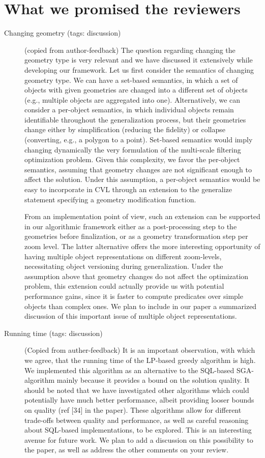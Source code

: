 \documentclass[11pt, oneside]{article}   	%
\begin{document}
\section{What we promised the reviewers}

\begin{description}
\item[Changing geometry (tags: discussion)] (copied from author-feedback) The question regarding changing the geometry type is very relevant and we have discussed it extensively while developing our framework. Let us first consider the semantics of changing geometry type. We can have a set-based semantics, in which a set of objects with given geometries are changed into a different set of objects (e.g., multiple objects are aggregated into one). Alternatively, we can consider a per-object semantics, in which individual objects remain identifiable throughout the generalization process, but their geometries change either by simplification (reducing the fidelity) or collapse (converting, e.g., a polygon to a point). Set-based semantics would imply changing dynamically the very formulation of the multi-scale filtering optimization problem. Given this complexity, we favor the per-object semantics, assuming that geometry changes are not significant enough to affect the solution. Under this assumption, a per-object semantics would be easy to incorporate in CVL through an extension to the generalize statement specifying a geometry modification function.

From an implementation point of view, such an extension can be supported in our algorithmic framework either as a post-processing step to the geometries before finalization, or as a geometry transformation step per zoom level. The latter alternative offers the more interesting opportunity of having multiple object representations on different zoom-levels, necessitating object versioning during generalization. Under the assumption above that geometry changes do not affect the optimization problem, this extension could actually provide us with potential performance gains, since it is faster to compute predicates over simple objects than complex ones. We plan to include in our paper a summarized discussion of this important issue of multiple object representations.

\item[Running time (tags: discussion)] (Copied from auther-feedback) It is an important observation, with which we agree, that the running time of the LP-based greedy algorithm is high. We implemented this algorithm as an alternative to the SQL-based SGA-algorithm mainly because it provides a bound on the solution quality. It should be noted that we have investigated other algorithms which could potentially have much better performance, albeit providing looser bounds on quality (ref [34] in the paper). These algorithms allow for different trade-offs between quality and performance, as well as careful reasoning about SQL-based implementations, to be explored. This is an interesting avenue for future work. We plan to add a discussion on this possibility to the paper, as well as address the other comments on your review.
\end{description}
\end{document}

